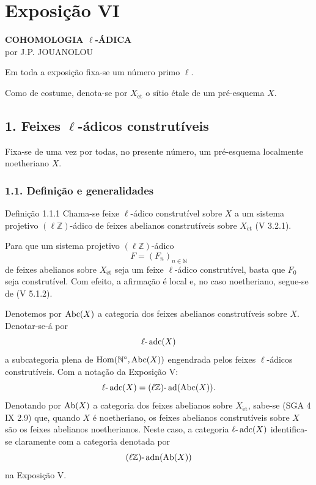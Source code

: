 \section*{Exposição VI}

\begin{center}
\textbf{COHOMOLOGIA \(\ell\)-ÁDICA}\\[0.5em]
por J.P. JOUANOLOU
\end{center}

Em toda a exposição fixa-se um número primo \(\ell\).

Como de costume, denota-se por \(X_{\mathrm{\acute et}}\) o sítio étale de um pré-esquema \(X\).

\subsection*{1. Feixes \(\ell\)-ádicos construtíveis}

Fixa-se de uma vez por todas, no presente número, um pré-esquema localmente noetheriano \(X\).

\subsubsection*{1.1. Definição e generalidades}

\begin{statement}{Definição 1.1.1}
Chama-se feixe \(\ell\)-ádico construtível sobre \(X\) a um sistema projetivo \((\ell\mathbb Z)\)-ádico de feixes abelianos construtíveis sobre \(X_{\mathrm{\acute et}}\) (V 3.2.1).
\end{statement}

Para que um sistema projetivo \((\ell\mathbb Z)\)-ádico
\[
F=(F_n)_{n\in\mathbb N}
\]
de feixes abelianos sobre \(X_{\mathrm{\acute et}}\) seja um feixe \(\ell\)-ádico construtível, basta que \(F_0\) seja construtível. Com efeito, a afirmação é local e, no caso noetheriano, segue-se de (V 5.1.2).

Denotemos por \(\operatorname{Abc}(X)\) a categoria dos feixes abelianos construtíveis sobre \(X\). Denotar-se-á por
\[
\ell\text{-}\operatorname{adc}(X)
\]
a subcategoria plena de \(\operatorname{Hom}(\mathbb N^{\circ},\operatorname{Abc}(X))\) engendrada pelos feixes \(\ell\)-ádicos construtíveis. Com a notação da Exposição V:
\[
\ell\text{-}\operatorname{adc}(X)=(\ell\mathbb Z)\text{-}\operatorname{ad}(\operatorname{Abc}(X)).
\]
Denotando por \(\operatorname{Ab}(X)\) a categoria dos feixes abelianos sobre \(X_{\mathrm{\acute et}}\), sabe-se (SGA 4 IX 2.9) que, quando \(X\) é noetheriano, os feixes abelianos construtíveis sobre \(X\) são os feixes abelianos noetherianos. Neste caso, a categoria \(\ell\text{-}\operatorname{adc}(X)\) identifica-se claramente com a categoria denotada por
\[
(\ell\mathbb Z)\text{-}\operatorname{adn}(\operatorname{Ab}(X))
\]
na Exposição V.

